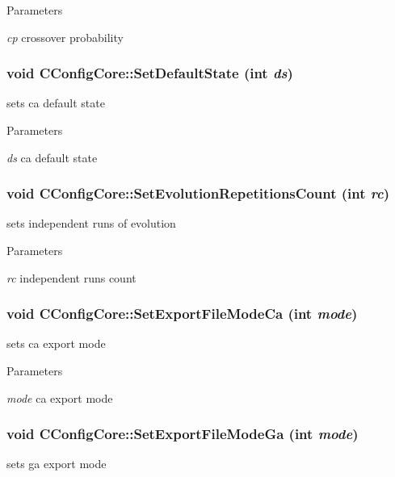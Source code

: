 \begin{DoxyParams}{Parameters}
\item[{\em cp}]crossover probability \end{DoxyParams}
\hypertarget{classCConfigCore_afde874d899af969cfd1a3cd08dba4234}{
\subsubsection[{SetDefaultState}]{\setlength{\rightskip}{0pt plus 5cm}void CConfigCore::SetDefaultState (int {\em ds})}}
\label{classCConfigCore_afde874d899af969cfd1a3cd08dba4234}
sets ca default state


\begin{DoxyParams}{Parameters}
\item[{\em ds}]ca default state \end{DoxyParams}
\hypertarget{classCConfigCore_ad9e4114043065f44391aa83e73670777}{
\subsubsection[{SetEvolutionRepetitionsCount}]{\setlength{\rightskip}{0pt plus 5cm}void CConfigCore::SetEvolutionRepetitionsCount (int {\em rc})}}
\label{classCConfigCore_ad9e4114043065f44391aa83e73670777}
sets independent runs of evolution


\begin{DoxyParams}{Parameters}
\item[{\em rc}]independent runs count \end{DoxyParams}
\hypertarget{classCConfigCore_ab7fb77f1f7774749c04e7d38eb67dbc3}{
\subsubsection[{SetExportFileModeCa}]{\setlength{\rightskip}{0pt plus 5cm}void CConfigCore::SetExportFileModeCa (int {\em mode})}}
\label{classCConfigCore_ab7fb77f1f7774749c04e7d38eb67dbc3}
sets ca export mode


\begin{DoxyParams}{Parameters}
\item[{\em mode}]ca export mode \end{DoxyParams}
\hypertarget{classCConfigCore_a3f1c3a2faf6edc0f4e77c27d3c8326f3}{
\subsubsection[{SetExportFileModeGa}]{\setlength{\rightskip}{0pt plus 5cm}void CConfigCore::SetExportFileModeGa (int {\em mode})}}
\label{classCConfigCore_a3f1c3a2faf6edc0f4e77c27d3c8326f3}
sets ga export mode


